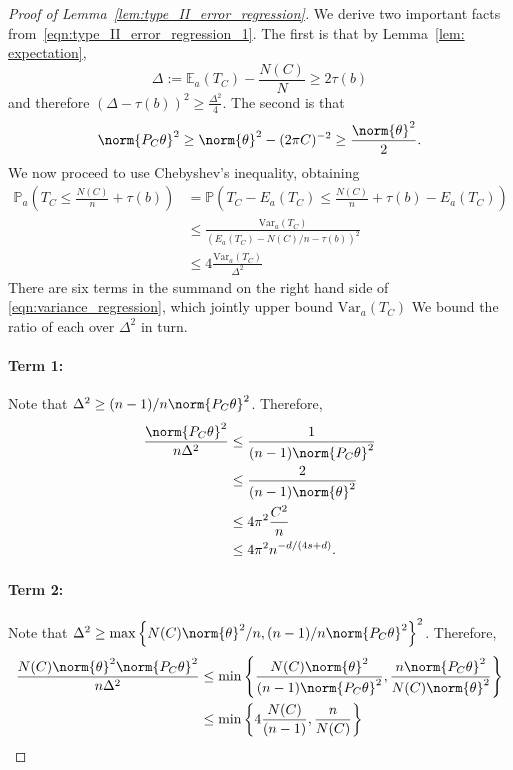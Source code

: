 \documentclass{article}
\newcommand{\set}[1]{\left\{#1\right\}}
\newcommand{\Var}{\mathrm{Var}}
\newcommand{\1}{\mathbb{I}}
\newcommand{\Pbb}{\mathbb{P}}
\newcommand{\Ebb}{\mathbb{E}}
\theoremstyle{alden}
\theoremstyle{aldenthm}
\theoremstyle{definition}
\theoremstyle{remark}
\begin{document}
\begin{proof}[Proof of Lemma~\ref{lem:type_II_error_regression}]
We derive two important facts from~\eqref{eqn:type_II_error_regression_1}. The first is that by Lemma~\ref{lem: expectation},
\begin{equation*}
\Delta := \Ebb_a(T_C) - \frac{N(C)}{N} \geq 2\tau(b)
\end{equation*}
and therefore $(\Delta - \tau(b))^2 \geq \frac{\Delta^2}{4}$. The second is that
\begin{equation*}
\norm{P_C\theta}^2 \geq \norm{\theta}^2 - (2\pi C)^{-2} \geq \frac{\norm{\theta}^2}{2}.
\end{equation*}
We now proceed to use Chebyshev's inequality, obtaining
\begin{align*}
\Pbb_a\left(T_C \leq \frac{N(C)}{n} + \tau(b) \right) & = \Pbb\left(T_C - E_a(T_C )\leq \frac{N(C)}{n} + \tau(b) - E_a(T_C) \right) \\
& \leq \frac{\Var_a(T_C)}{(E_a(T_C) - N(C)/n - \tau(b))^2} \\
& \leq 4\frac{\Var_a(T_C)}{\Delta^2}
\end{align*}
There are six terms in the summand on the right hand side of \eqref{eqn:variance_regression}, which jointly upper bound $\Var_a(T_C)$ We bound the ratio of each over $\Delta^2$ in turn.
\paragraph{Term 1:}
Note that $\Delta^2 \geq (n - 1)/n \norm{P_C\theta}^2$. Therefore,
\begin{align*}
\frac{\norm{P_C\theta}^2}{n\Delta^2} & \leq \frac{1}{(n - 1)\norm{P_C\theta}^2} \\
& \leq \frac{2}{(n - 1)\norm{\theta}^2} \\
& \leq 4\pi^2\frac{C^2}{n} \\
& \leq 4\pi^2n^{-d/(4s+d)}.
\end{align*}

\paragraph{Term 2:}
Note that $\Delta^2 \geq \max\set{N(C)\norm{\theta}^2/n, (n-1)/n\norm{P_C\theta}^2}^2$. Therefore,
\begin{align*}
\frac{N(C) \norm{\theta}^2 \norm{P_C\theta}^2}{n \Delta^2} & \leq \min\set{ \frac{N(C)\norm{\theta}^2}{(n - 1) \norm{P_C\theta}^2}, \frac{n \norm{P_C\theta}^2}{N(C) \norm{\theta}^2}} \\
& \leq \min \set{ 4 \frac{N(C)}{(n - 1)} , \frac{n}{N(C)} }
\end{align*}


\end{proof}
\end{document}
